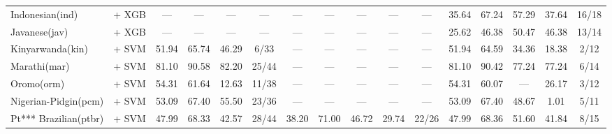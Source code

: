 \begin{table*}[h]
{\begin{tabular}{l|c|cccc|ccccc|ccccc}
            Indonesian(ind)        & \citep{wang2024multilingual}   + XGB                                   & —                            & —                            & —                           & —             & —             & —           & —              & —             & —             & 35.64         & 67.24       & 57.29          & 37.64         & 16/18         \\
            Javanese(jav)          & \citep{wang2024multilingual}   + XGB                                   & —                            & —                            & —                           & —             & —             & —           & —              & —             & —             & 25.62         & 46.38       & 50.47          & 46.38         & 13/14         \\
            Kinyarwanda(kin)       & \citep{wang2024multilingual}  + SVM                                    & 51.94                        & 65.74                        & 46.29                       & 6/33          & —             & —           & —              & —             & —             & 51.94         & 64.59       & 34.36          & 18.38         & 2/12          \\
            Marathi(mar)           & \citep{wang2024multilingual}   + SVM                                   & 81.10                        & 90.58                        & 82.20                       & 25/44         & —             & —           & —              & —             & —             & 81.10         & 90.42       & 77.24          & 77.24         & 6/14          \\
            Oromo(orm)             & \citep{wang2024multilingual}    + SVM                                  & 54.31                        & 61.64                        & 12.63                       & 11/38         & —             & —           & —              & —             & —             & 54.31         & 60.07       & —              & 26.17         & 3/12          \\
            Nigerian-Pidgin(pcm)   & \citep{wang2024multilingual}   + SVM                                   & 53.09                        & 67.40                        & 55.50                       & 23/36         & —             & —           & —              & —             & —             & 53.09         & 67.40       & 48.67          & 1.01          & 5/11          \\
            Pt*** Brazilian(ptbr)  & \citep{souza2020bertimbau} + SVM                                       & 47.99                        & 68.33                        & 42.57                       & 28/44         & 38.20         & 71.00       & 46.72          & 29.74         & 22/26         & 47.99         & 68.36       & 51.60          & 41.84         & 8/15          \\

\end{tabular}}
\end{table*}
